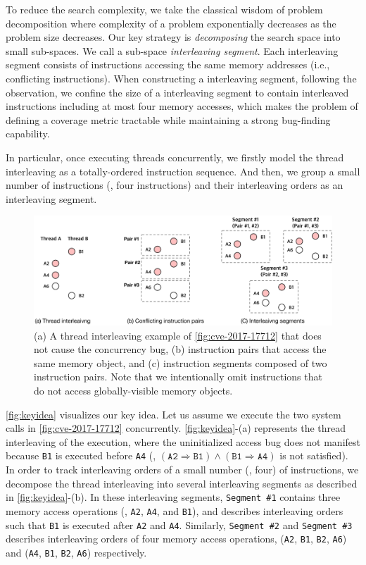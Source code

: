 To reduce the search complexity, we take the classical wisdom of problem decomposition where 
complexity of a problem exponentially decreases as the problem size decreases.
Our key strategy is \textit{decomposing} the search space into 
small sub-spaces. We call a sub-space \textit{interleaving segment}.
%
Each interleaving segment consists of instructions accessing 
the same memory addresses (i.e., conflicting instructions).
%
When constructing a interleaving segment, following the observation, 
we confine the size of a interleaving segment 
to contain interleaved instructions including at most four memory accesses,
which makes the problem of defining a coverage metric tractable while maintaining a strong bug-finding capability.

%
In particular, once executing threads concurrently, we firstly model
the thread interleaving as a totally-ordered instruction sequence.
%
And then, we group a small number of instructions (\eg, four
instructions) and their interleaving orders as an interleaving segment.


\begin{figure}[t]
  \centering
  \includegraphics[width=0.9\linewidth]{fig/intuition.pdf}
  \caption{(a) A thread interleaving example of
    \autoref{fig:cve-2017-17712} that does not cause the concurrency
    bug, (b) instruction pairs that access the same memory object, and
    (c) instruction segments composed of two instruction pairs.  Note
    that we intentionally omit instructions that do not access
    globally-visible memory objects.}
  \label{fig:keyidea}
\end{figure}
%
\autoref{fig:keyidea} visualizes our key idea.
%
Let us assume we execute the two system calls in
\autoref{fig:cve-2017-17712} concurrently.
%
\autoref{fig:keyidea}-(a) represents the thread interleaving of the
execution, where the uninitialized access bug does not manifest
because \texttt{B1} is executed before \texttt{A4} (\ie,
$(\texttt{A2} \Rightarrow \texttt{B1}) \wedge (\texttt{B1} \Rightarrow
\texttt{A4})$ is not satisfied).
%
In order to track interleaving orders of a small number (\eg, four) of
instructions, we decompose the thread interleaving into several
interleaving segments as described in \autoref{fig:keyidea}-(b).
%
In these interleaving segments, \texttt{Segment \#1} contains three
memory access operations (\ie, \texttt{A2}, \texttt{A4}, and
\texttt{B1}), and describes interleaving orders such that \texttt{B1}
is executed after \texttt{A2} and \texttt{A4}.
%
Similarly, \texttt{Segment \#2} and \texttt{Segment \#3} describes
interleaving orders of four memory access operations, (\texttt{A2},
\texttt{B1}, \texttt{B2}, \texttt{A6}) and (\texttt{A4}, \texttt{B1},
\texttt{B2}, \texttt{A6}) respectively.
%

